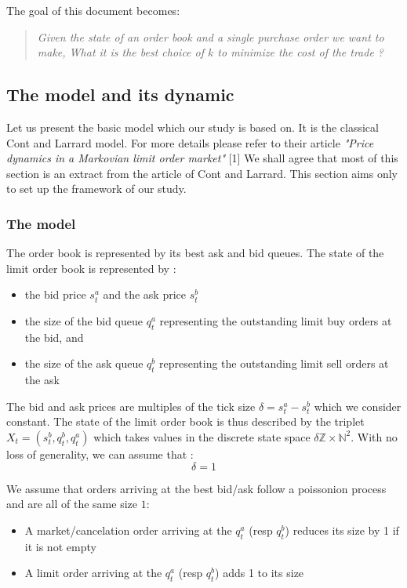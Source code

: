 \documentclass{article}
\begin{document}
The goal of this document becomes:
\begin{quote}
\textit{Given the state of an order book and a single purchase order we want to make, What it is the best choice of $k$ to minimize the cost of the trade  ?}
\end{quote}


\subsection{The model and its dynamic}
Let us present the basic model which our study is based on. It is the classical Cont and Larrard model. For more details please refer to their article \textit{"Price dynamics in a Markovian limit order market"} [1]
\newline
We shall agree that most of this section is an extract from the article of Cont and Larrard. This section aims only to set up the framework of our study.
\subsubsection{The model}
The order book is represented by its best ask and bid queues. The state of the limit order book is represented by :
\begin{itemize}
\item the bid price $ s_{t}^{a} $ and the ask price $ s_{t}^{b} $ 
\item the size of the bid queue $ q_{t}^{a} $ representing the outstanding limit buy orders at the bid, and 
\item the size of the ask queue $ q_{t}^{b} $ representing the outstanding limit sell orders at the ask 
\end{itemize}
The bid and ask prices are multiples of the tick size $\delta = s_{t}^{a} - s_{t}^{b}$ which we consider constant.
The state of the limit order book is thus described by the triplet $X_{t} = (s_{t}^{b}, q_{t}^{b}, q_{t}^{a})$ which takes values in the discrete state space $\delta \mathbb{Z} \times \mathbb{N}^{2} $. With no loss of generality, we can assume that  :
\begin{equation}
\delta = 1
\end{equation}

We assume that orders arriving at the best bid/ask follow a poissonion process and are all of the same size $1$:
\begin{itemize}
	\item A market/cancelation order arriving at the $q_t^a$ (resp $q_t^b$) reduces its size by 1 if it is not empty
	\item A limit order arriving at the $q_t^a$ (resp $q_t^b$) adds 1 to its size 
\end{itemize}
\end{document}
